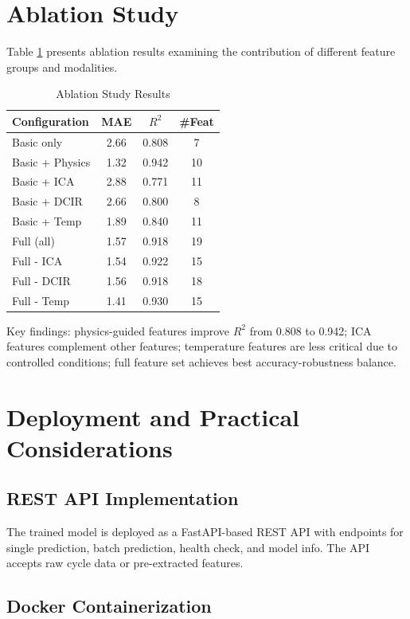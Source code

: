 \documentclass[conference]{IEEEtran}
\begin{document}
\section{Ablation Study}

Table \ref{tab:ablation} presents ablation results examining the contribution of different feature groups and modalities.

\begin{table}[htbp]
\caption{Ablation Study Results}
\label{tab:ablation}
\centering
\small
\begin{tabular}{lccc}
\toprule
\textbf{Configuration} & \textbf{MAE} & \textbf{$R^2$} & \textbf{\#Feat} \\
\midrule
Basic only & 2.66 & 0.808 & 7 \\
Basic + Physics & 1.32 & 0.942 & 10 \\
Basic + ICA & 2.88 & 0.771 & 11 \\
Basic + DCIR & 2.66 & 0.800 & 8 \\
Basic + Temp & 1.89 & 0.840 & 11 \\
\midrule
Full (all) & 1.57 & 0.918 & 19 \\
Full - ICA & 1.54 & 0.922 & 15 \\
Full - DCIR & 1.56 & 0.918 & 18 \\
Full - Temp & 1.41 & 0.930 & 15 \\
\bottomrule
\end{tabular}
\end{table}

Key findings: physics-guided features improve $R^2$ from 0.808 to 0.942; ICA features complement other features; temperature features are less critical due to controlled conditions; full feature set achieves best accuracy-robustness balance.

\section{Deployment and Practical Considerations}

\subsection{REST API Implementation}

The trained model is deployed as a FastAPI-based REST API with endpoints for single prediction, batch prediction, health check, and model info. The API accepts raw cycle data or pre-extracted features.

\subsection{Docker Containerization}
\end{document}
